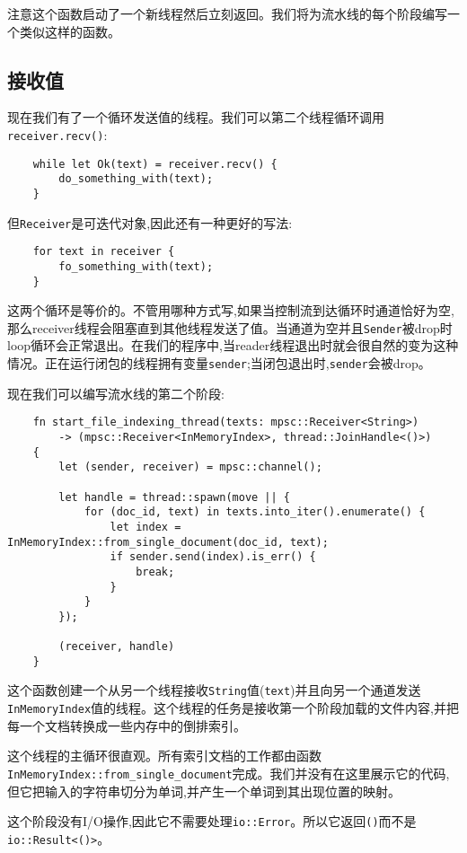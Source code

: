 注意这个函数启动了一个新线程然后立刻返回。我们将为流水线的每个阶段编写一个类似这样的函数。

\subsection{接收值}
现在我们有了一个循环发送值的线程。我们可以第二个线程循环调用\texttt{receiver.recv()}:
\begin{verbatim}
    while let Ok(text) = receiver.recv() {
        do_something_with(text);
    }
\end{verbatim}

但\texttt{Receiver}是可迭代对象,因此还有一种更好的写法:
\begin{verbatim}
    for text in receiver {
        fo_something_with(text);
    }
\end{verbatim}

这两个循环是等价的。不管用哪种方式写,如果当控制流到达循环时通道恰好为空,那么receiver线程会阻塞直到其他线程发送了值。当通道为空并且\texttt{Sender}被drop时loop循环会正常退出。在我们的程序中,当reader线程退出时就会很自然的变为这种情况。正在运行闭包的线程拥有变量\texttt{sender};当闭包退出时,\texttt{sender}会被drop。

现在我们可以编写流水线的第二个阶段:
\begin{verbatim}
    fn start_file_indexing_thread(texts: mpsc::Receiver<String>)
        -> (mpsc::Receiver<InMemoryIndex>, thread::JoinHandle<()>)
    {
        let (sender, receiver) = mpsc::channel();

        let handle = thread::spawn(move || {
            for (doc_id, text) in texts.into_iter().enumerate() {
                let index = InMemoryIndex::from_single_document(doc_id, text);
                if sender.send(index).is_err() {
                    break;
                }
            }
        });

        (receiver, handle)
    }
\end{verbatim}

这个函数创建一个从另一个线程接收\texttt{String}值(\texttt{text})并且向另一个通道发送\texttt{InMemoryIndex}值的线程。这个线程的任务是接收第一个阶段加载的文件内容,并把每一个文档转换成一些内存中的倒排索引。

这个线程的主循环很直观。所有索引文档的工作都由函数\texttt{InMemoryIndex::from\_single\_document}完成。我们并没有在这里展示它的代码,但它把输入的字符串切分为单词,并产生一个单词到其出现位置的映射。

这个阶段没有I/O操作,因此它不需要处理\texttt{io::Error}。所以它返回\texttt{()}而不是\texttt{io::Result<()>}。


